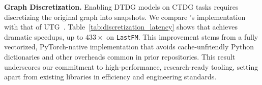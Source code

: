 

\begin{minipage}[t]{0.56\textwidth}  %
\textbf{Graph Discretization.} Enabling DTDG models on CTDG tasks requires discretizing the original graph into snapshots. We compare \name's implementation with that of UTG~\citep{utg}. Table~\ref{tab:discretization_latency} shows that \name achieves dramatic speedups, up to $433\times$ on \texttt{LastFM}. This improvement stems from a fully vectorized, PyTorch-native implementation that avoids cache-unfriendly Python dictionaries and other overheads common in prior repositories. This result underscores our commitment to high-performance, research-ready tooling, setting \name apart from existing libraries in efficiency and engineering standards.

\end{minipage}%
\hfill
\begin{minipage}[t]{0.4\textwidth}  %
\centering
{}
\label{tab:discretization_latency}
\end{minipage}



